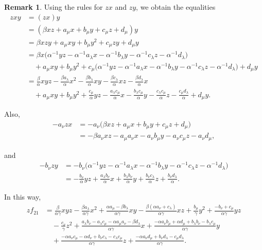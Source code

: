 \documentclass{amsart}
\theoremstyle{definition}
\newtheorem{remark}[theorem]{Remark}
\theoremstyle{remark}
\numberwithin{equation}{section}
\begin{document}
\begin{remark}
Using the rules for $zx$ and $zy$, we obtain the equalities 
\begin{align*}
zxy
& = (zx)y\\
& = (\beta xz+a_{\mu}x+b_{\mu}y+c_{\mu}z+d_{\mu})y\\
& = \beta xzy+a_{\mu}xy+b_{\mu}y^2+c_{\mu}zy+d_{\mu}y\\
& = \beta x\bigl(\alpha^{-1}yz-\alpha^{-1}a_{\lambda}x-\alpha^{-1}b_{\lambda}y-\alpha^{-1}c_{\lambda}z-\alpha^{-1}d_{\lambda}\bigr)\\
&  \quad + a_{\mu}xy+b_{\mu}y^2+c_{\mu}\bigl(\alpha^{-1}yz-\alpha^{-1}a_{\lambda}x-\alpha^{-1}b_{\lambda}y-\alpha^{-1}c_{\lambda}z-\alpha^{-1}d_{\lambda}\bigr)+d_{\mu}y\\
& = \frac{\beta}{\alpha}xyz-\frac{\beta a_{\lambda}}{\alpha}x^2-\frac{\beta b_{\lambda}}{\alpha}xy-\frac{\beta c_{\lambda}}{\alpha}xz-\frac{\beta d_{\lambda}}{\alpha}x\\
&  \quad + a_{\mu}xy+b_{\mu}y^2+\frac{c_{\mu}}{\alpha}yz-\frac{a_{\lambda}c_{\mu}}{\alpha}x-\frac{b_{\lambda}c_{\mu}}{\alpha}y-\frac{c_{\lambda}c_{\mu}}{\alpha}z-\frac{c_{\mu}d_{\lambda}}{\alpha}+d_{\mu}y.
\end{align*}

Also,
\begin{align*}
-a_{\nu}zx
&=-a_{\nu}\bigl(\beta xz+a_{\mu}x+b_{\mu}y+c_{\mu}z+d_{\mu}\bigr)\\
&=-\beta a_{\nu}xz-a_{\mu}a_{\nu}x-a_{\nu}b_{\mu}y-a_{\nu}c_{\mu}z-a_{\nu}d_{\mu},
\end{align*}

and
\begin{align*}
-b_{\nu}zy
&=-b_{\nu}\bigl(\alpha^{-1}yz-\alpha^{-1}a_{\lambda}x-\alpha^{-1}b_{\lambda}y-\alpha^{-1}c_{\lambda}z-\alpha^{-1}d_{\lambda}\bigr)\\
&=-\frac{b_{\nu}}{\alpha}yz+\frac{a_{\lambda}b_{\nu}}{\alpha}x+\frac{b_{\lambda}b_{\nu}}{\alpha}y+\frac{b_{\nu}c_{\lambda}}{\alpha}z+\frac{b_{\nu}d_{\lambda}}{\alpha}.
\end{align*}


In this way, 
\begin{align*}
z f_{21}
& = \frac{\beta}{\alpha\gamma}xyz
-\frac{\beta a_{\lambda}}{\alpha\gamma}x^2
+\frac{\alpha a_{\mu}-\beta b_{\lambda}}{\alpha\gamma}xy
-\frac{\beta(\alpha a_{\nu}+c_{\lambda})}{\alpha\gamma}xz
+\frac{b_{\mu}}{\gamma}y^2 + \frac{-b_{\nu}+c_{\mu}}{\alpha\gamma}yz \\
& \quad - \frac{c_{\nu}}{\gamma}z^2 + \frac{a_{\lambda}b_{\nu}-a_{\lambda}c_{\mu}-\alpha a_{\mu}a_{\nu}-\beta d_{\lambda}}{\alpha\gamma}x + \frac{-\alpha a_{\nu}b_{\mu}+\alpha d_{\mu}+b_{\lambda}b_{\nu}-b_{\lambda}c_{\mu}}{\alpha\gamma}y\\
& \quad + \frac{-\alpha a_{\nu}c_{\mu}-\alpha d_{\nu}+b_{\nu}c_{\lambda}-c_{\lambda}c_{\mu}}{\alpha\gamma}z + \frac{-\alpha a_{\nu}d_{\mu}+b_{\nu}d_{\lambda}-c_{\mu}d_{\lambda}}{\alpha\gamma}.
\end{align*}


\end{remark}
\end{document}
